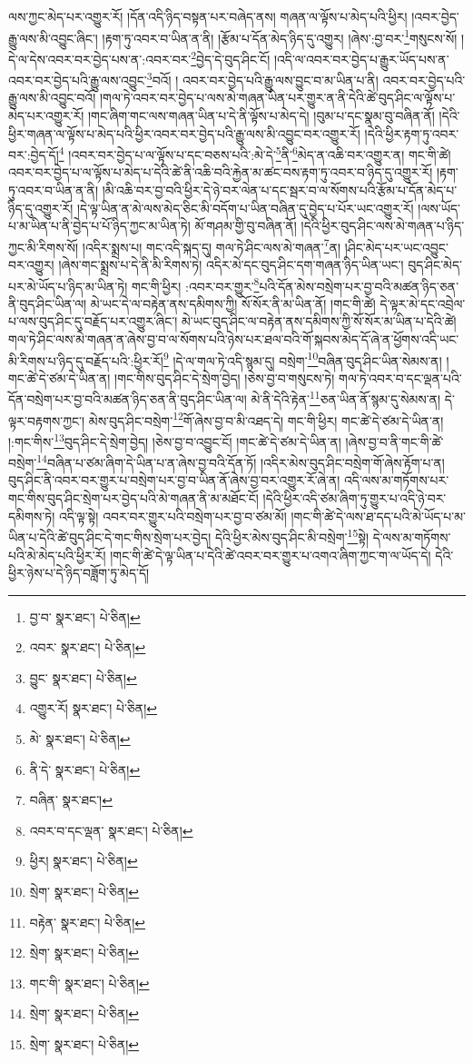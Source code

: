 ལས་ཀྱང་མེད་པར་འགྱུར་རོ། །དོན་འདི་ཉིད་བསྟན་པར་བཞེད་ནས། གཞན་ལ་ལྟོས་པ་མེད་པའི་ཕྱིར། །འབར་བྱེད་རྒྱུ་ལས་མི་འབྱུང་ཞིང་། །རྟག་ཏུ་འབར་བ་ཡིན་ན་ནི། །རྩོམ་པ་དོན་མེད་ཉིད་དུ་འགྱུར། །ཞེས་:བྱ་བར་\footnote{བྱ་བ་  སྣར་ཐང་།  པེ་ཅིན། }གསུངས་སོ། །དེ་ལ་དེས་འབར་བར་བྱེད་པས་ན་:འབར་བར་\footnote{འབར་  སྣར་ཐང་།  པེ་ཅིན། }བྱེད་དེ་བུད་ཤིང་ངོ། །འདི་ལ་འབར་བར་བྱེད་པ་རྒྱུར་ཡོད་པས་ན་འབར་བར་བྱེད་པའི་རྒྱུ་ལས་འབྱུང་\footnote{བྱུང་  སྣར་ཐང་།  པེ་ཅིན། }བའོ། །
འབར་བར་བྱེད་པའི་རྒྱུ་ལས་བྱུང་བ་མ་ཡིན་པ་ནི། འབར་བར་བྱེད་པའི་རྒྱུ་ལས་མི་འབྱུང་བའོ། །གལ་ཏེ་འབར་བར་བྱེད་པ་ལས་མེ་གཞན་ཡིན་པར་གྱུར་ན་ནི་དེའི་ཚེ་བུད་ཤིང་ལ་ལྟོས་པ་མེད་པར་འགྱུར་རོ། །གང་ཞིག་གང་ལས་གཞན་ཡིན་པ་དེ་ནི་ལྟོས་པ་མེད་དེ། །བུམ་པ་དང་སྣམ་བུ་བཞིན་ནོ། །དེའི་ཕྱིར་གཞན་ལ་ལྟོས་པ་མེད་པའི་ཕྱིར་འབར་བར་བྱེད་པའི་རྒྱུ་ལས་མི་འབྱུང་བར་འགྱུར་རོ། །དེའི་ཕྱིར་རྟག་ཏུ་འབར་བར་:བྱེད་དོ།\footnote{འགྱུར་རོ།  སྣར་ཐང་།  པེ་ཅིན། } །འབར་བར་བྱེད་པ་ལ་ལྟོས་པ་དང་བཅས་པའི་:མེ་དེ་\footnote{མེ་  སྣར་ཐང་།  པེ་ཅིན། }ནི་\footnote{ནི་དེ་  སྣར་ཐང་།  པེ་ཅིན། }མེད་ན་འཆི་བར་འགྱུར་ན། གང་གི་ཚེ། འབར་བར་བྱེད་པ་ལ་ལྟོས་པ་མེད་པ་དེའི་ཚེ་ནི་འཆི་བའི་རྐྱེན་མ་ཚང་བས་རྟག་ཏུ་འབར་བ་ཉིད་དུ་འགྱུར་རོ། །རྟག་ཏུ་འབར་བ་ཡིན་ན་ནི། །མི་འཆི་བར་བྱ་བའི་ཕྱིར་དེ་ཉེ་བར་ལེན་པ་དང་སྦར་བ་ལ་སོགས་པའི་རྩོམ་པ་དོན་མེད་པ་ཉིད་དུ་འགྱུར་རོ། །དེ་ལྟ་ཡིན་ན་མེ་ལས་མེད་ཅིང་མི་བདོག་པ་ཡིན་བཞིན་དུ་བྱེད་པ་པོར་ཡང་འགྱུར་རོ། །ལས་ཡོད་པ་མ་ཡིན་པ་ནི་བྱེད་པ་པོ་ཉིད་ཀྱང་མ་ཡིན་ཏེ། མོ་གཤམ་གྱི་བུ་བཞིན་ནོ། །དེའི་ཕྱིར་བུད་ཤིང་ལས་མེ་གཞན་པ་ཉིད་ཀྱང་མི་རིགས་སོ། །འདིར་སྨྲས་པ། གང་འདི་སྐད་དུ། གལ་ཏེ་ཤིང་ལས་མེ་གཞན་\footnote{བཞིན་  སྣར་ཐང་། }ན། །ཤིང་མེད་པར་ཡང་འབྱུང་བར་འགྱུར། །ཞེས་གང་སྨྲས་པ་དེ་ནི་མི་རིགས་ཏེ། འདིར་མེ་དང་བུད་ཤིང་དག་གཞན་ཉིད་ཡིན་ཡང་། བུད་ཤིང་མེད་པར་མེ་ཡོད་པ་ཉིད་མ་ཡིན་ཏེ། གང་གི་ཕྱིར། :འབར་བར་གྱུར་\footnote{འབར་བ་དང་ལྡན་  སྣར་ཐང་།  པེ་ཅིན། }པའི་དོན་མེས་བསྲེག་པར་བྱ་བའི་མཚན་ཉིད་ཅན་ནི་བུད་ཤིང་ཡིན་ལ། མེ་ཡང་དེ་ལ་བརྟེན་ནས་དམིགས་ཀྱི། སོ་སོར་ནི་མ་ཡིན་ནོ། །གང་གི་ཚེ། དེ་ལྟར་མེ་དང་འབྲེལ་པ་ལས་བུད་ཤིང་དུ་བརྗོད་པར་འགྱུར་ཞིང་། མེ་ཡང་བུད་ཤིང་ལ་བརྟེན་ནས་དམིགས་ཀྱི་སོ་སོར་མ་ཡིན་པ་དེའི་ཚེ། གལ་ཏེ་ཤིང་ལས་མེ་གཞན་ན་ཞེས་བྱ་བ་ལ་སོགས་པའི་ཉེས་པར་ཐལ་བའི་གོ་སྐབས་མེད་དོ་ཞེ་ན་ཕྱོགས་འདི་ཡང་མི་རིགས་པ་ཉིད་དུ་བརྗོད་པའི་:ཕྱིར་རོ།\footnote{ཕྱིར།  སྣར་ཐང་།  པེ་ཅིན། } །དེ་ལ་གལ་ཏེ་འདི་སྙམ་དུ། བསྲེག་\footnote{སྲེག་  སྣར་ཐང་།  པེ་ཅིན། }བཞིན་བུད་ཤིང་ཡིན་སེམས་ན། །གང་ཚེ་དེ་ཙམ་དེ་ཡིན་ན། །གང་གིས་བུད་ཤིང་དེ་སྲེག་བྱེད། །ཅེས་བྱ་བ་གསུངས་ཏེ། གལ་ཏེ་འབར་བ་དང་ལྡན་པའི་དོན་བསྲེག་པར་བྱ་བའི་མཚན་ཉིད་ཅན་ནི་བུད་ཤིང་ཡིན་ལ། མེ་ནི་དེའི་རྟེན་\footnote{བརྟེན་  སྣར་ཐང་།  པེ་ཅིན། }ཅན་ཡིན་ནོ་སྙམ་དུ་སེམས་ན། དེ་ལྟར་བརྟགས་ཀྱང་། མེས་བུད་ཤིང་བསྲེག་\footnote{སྲེག་  སྣར་ཐང་།  པེ་ཅིན། }གོ་ཞེས་བྱ་བ་མི་འཐད་དེ། གང་གི་ཕྱིར། གང་ཚེ་དེ་ཙམ་དེ་ཡིན་ན། །:གང་གིས་\footnote{གང་གི་  སྣར་ཐང་།  པེ་ཅིན། }བུད་ཤིང་དེ་སྲེག་བྱེད། །ཅེས་བྱ་བ་འབྱུང་ངོ། །གང་ཚེ་དེ་ཙམ་དེ་ཡིན་ན། །ཞེས་བྱ་བ་ནི་གང་གི་ཚེ་བསྲེག་\footnote{སྲེག་  སྣར་ཐང་།  པེ་ཅིན། }བཞིན་པ་ཙམ་ཞིག་དེ་ཡིན་པ་ན་ཞེས་བྱ་བའི་དོན་ཏོ། །འདིར་མེས་བུད་ཤིང་བསྲེག་གོ་ཞེས་རྟོག་པ་ན། བུད་ཤིང་ནི་འབར་བར་གྱུར་པ་བསྲེག་པར་བྱ་བ་ཡིན་ནོ་ཞེས་བྱ་བར་འགྱུར་རོ་ཞེ་ན། འདི་ལས་མ་གཏོགས་པར་གང་གིས་བུད་ཤིང་སྲེག་པར་བྱེད་པའི་མེ་གཞན་ནི་མ་མཐོང་ངོ། །དེའི་ཕྱིར་འདི་ཙམ་ཞིག་ཏུ་གྱུར་པ་འདི་ཉེ་བར་དམིགས་ཏེ། འདི་ལྟ་སྟེ། འབར་བར་གྱུར་པའི་བསྲེག་པར་བྱ་བ་ཙམ་མོ། །གང་གི་ཚེ་དེ་ལས་ཐ་དད་པའི་མེ་ཡོད་པ་མ་ཡིན་པ་དེའི་ཚེ་བུད་ཤིང་དེ་གང་གིས་སྲེག་པར་བྱེད། དེའི་ཕྱིར་མེས་བུད་ཤིང་མི་བསྲེག་\footnote{སྲེག་  སྣར་ཐང་།  པེ་ཅིན། }སྟེ། དེ་ལས་མ་གཏོགས་པའི་མེ་མེད་པའི་ཕྱིར་རོ། །གང་གི་ཚེ་དེ་ལྟ་ཡིན་པ་དེའི་ཚེ་འབར་བར་གྱུར་པ་འགའ་ཞིག་ཀྱང་ག་ལ་ཡོད་དེ། དེའི་ཕྱིར་ཉེས་པ་དེ་ཉིད་བཟློག་ཏུ་མེད་དོ། 